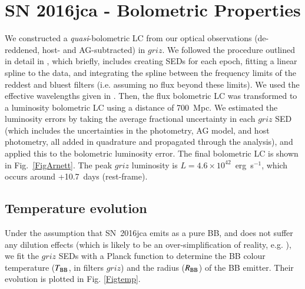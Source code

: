 \documentclass[traditabstract,longauth]{aa}
\begin{document}
\section{SN 2016jca - Bolometric Properties}
\label{sec:bolo}

We constructed a \emph{quasi}-bolometric LC from our optical observations (de-reddened, host- and AG-subtracted) in $griz$.  We followed the procedure outlined in detail in \citet{CMS14}, which briefly, includes creating SEDs for each epoch, fitting a linear spline to the data, and integrating the spline between the frequency limits of the reddest and bluest filters (i.e. assuming no flux beyond these limits).  We used the effective wavelengths given in \citet{Fukugita95}.  Then, the flux bolometric LC was transformed to a luminosity bolometric LC using a distance of 700~Mpc.  We estimated the luminosity errors by taking the average fractional uncertainty in each $griz$ SED (which includes the uncertainties in the photometry, AG model, and host photometry, all added in quadrature and propagated through the analysis), and applied this to the bolometric luminosity error. The final bolometric LC is shown in Fig.~\ref{FigArnett}.  The peak $griz$ luminosity is $L = 4.6\times10^{42}$~erg~s$^{-1}$, which occurs around +10.7~days (rest-frame).








\subsection{Temperature evolution}
\label{sec:temp_evo}

Under the assumption that SN~2016jca emits as a pure BB, and does not suffer any dilution effects (which is likely to be an over-simplification of reality, e.g. \citealt{Dessart05,Dessart15}), we fit the $griz$ SEDs with a Planck function to determine the BB colour temperature ($T_{\rm BB}$, in filters $griz$) and the radius ($R_{\rm BB}$) of the BB emitter.  Their evolution is plotted in Fig. \ref{Figtemp}.

\end{document}
